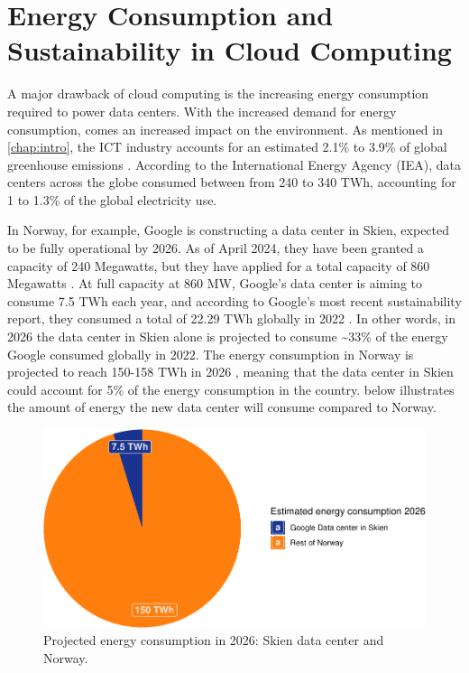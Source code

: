 \documentclass[
  table]{report}
\begin{document}
\section{Energy Consumption and Sustainability in Cloud Computing}

A major drawback of cloud computing is the increasing energy consumption
required to power data centers. With the increased demand for energy
consumption, comes an increased impact on the environment. As mentioned
in \cref{chap:intro}, the ICT industry accounts for an estimated 2.1\%
to 3.9\% of global greenhouse emissions \citep{freitag2021}. According
to the International Energy Agency (IEA), data centers across the globe
consumed between from 240 to 340 TWh, accounting for 1 to 1.3\% of the
global electricity use.

In Norway, for example, Google is constructing a data center in Skien,
expected to be fully operational by 2026. As of April 2024, they have
been granted a capacity of 240 Megawatts, but they have applied for a
total capacity of 860 Megawatts
\citep{rivrudInvesteringenAvGooglesenter2024}. At full capacity at 860
MW, Google's data center is aiming to consume 7.5 TWh each year, and
according to Google's most recent sustainability report, they consumed a
total of 22.29 TWh globally in 2022 \citep{Google2023Environmental2023}.
In other words, in 2026 the data center in Skien alone is projected to
consume \textasciitilde33\% of the energy Google consumed globally in
2022. The energy consumption in Norway is projected to reach 150-158 TWh
in 2026 \citep{gunnerodStatnettAnalyse2022}, meaning that the data
center in Skien could account for 5\% of the energy consumption in the
country.  below illustrates the amount of energy
the new data center will consume compared to Norway.

\vspace{0.25cm}

\begin{figure}[H]

{\centering \includegraphics[width=0.8\linewidth]{thesis_files/figure-latex/skienvsnorway-1} 

}

\caption{Projected energy consumption in 2026: Skien data center and Norway.}\label{fig:skienvsnorway}
\end{figure}
\end{document}
